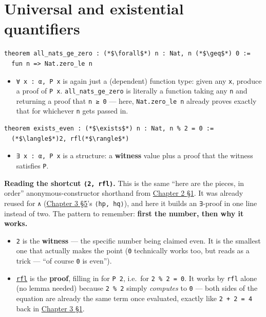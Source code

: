 \section{Universal and existential quantifiers}\label{sec:03-propositions-and-proofs:06-quantifiers:1}

\begin{lstlisting}
theorem all_nats_ge_zero : (*$\forall$*) n : Nat, n (*$\geq$*) 0 :=
  fun n => Nat.zero_le n
\end{lstlisting}

\begin{itemize}
\tightlist
\item
  \texttt{∀ x : α, P x} is again just a (dependent) function type: given any \texttt{x}, produce a proof of \texttt{P x}. \texttt{all\_\allowbreak{}nats\_\allowbreak{}ge\_\allowbreak{}zero} is literally a function taking any \texttt{n} and returning a proof that \texttt{n ≥ 0} --- here, \texttt{Nat.zero\_\allowbreak{}le n} already proves exactly that for whichever \texttt{n} gets passed in.
\end{itemize}

\begin{lstlisting}
theorem exists_even : (*$\exists$*) n : Nat, n % 2 = 0 :=
  (*$\langle$*)2, rfl(*$\rangle$*)
\end{lstlisting}

\begin{itemize}
\tightlist
\item
  \texttt{∃ x : α, P x} is a structure: a \textbf{witness} value plus a proof that the witness satisfies \texttt{P}.
\end{itemize}

\textbf{Reading the shortcut \texttt{⟨2, rfl⟩}.} This is the same ``here are the pieces, in order'' anonymous-constructor shorthand from \hyperref[sec:02-functions-and-structures:01-structure-basics:1]{Chapter 2 §1}. It was already reused for \texttt{∧} (\hyperref[sec:03-propositions-and-proofs:05-and-or-not:1]{Chapter 3 §5}'s \texttt{⟨hp, hq⟩}), and here it builds an \texttt{∃}-proof in one line instead of two. The pattern to remember: \textbf{first the number, then why it works.}

\begin{itemize}
\tightlist
\item
  \texttt{2} is the \textbf{witness} --- the specific number being claimed even. It is the smallest one that actually makes the point (\texttt{0} technically works too, but reads as a trick --- ``of course \texttt{0} is even'').
\item
  \href{https://lean-lang.org/doc/reference/latest/Tactic-Proofs/Tactic-Reference/}{\texttt{rfl}} is the \textbf{proof}, filling in for \texttt{P 2}, i.e.~for \texttt{2 \% 2 = 0}. It works by \texttt{rfl} alone (no lemma needed) because \texttt{2 \% 2} simply \emph{computes} to \texttt{0} --- both sides of the equation are already the same term once evaluated, exactly like \texttt{2 + 2 = 4} back in \hyperref[sec:03-propositions-and-proofs:01-prop:1]{Chapter 3 §1}.
\end{itemize}

